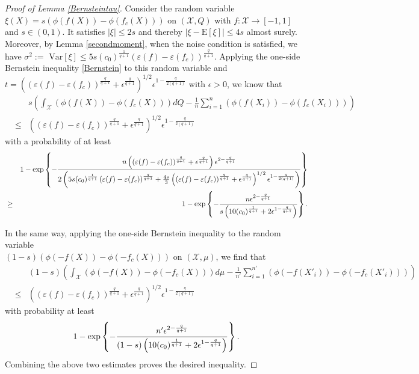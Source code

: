 \documentclass{article}
\begin{document}
\begin{proof}[Proof of Lemma \ref{Bernsteintau}]
Consider the random variable $\xi (X) = s\left(\phi(f(X)) - \phi(f_c(X))\right)$ on $({\mathcal X}, Q)$ with $f: {\mathcal X} \to [-1, 1]$ and $s\in (0, 1)$. It satisfies $|\xi| \leq 2s$ and thereby $|\xi - \mathrm{E}[\xi]|\le 4 s$ almost surely. Moreover, by Lemma \ref{secondmoment}, when the noise condition is satisfied, we have $\sigma^2 := \text{ Var}[\xi] \leq 5 s (c_0)^{\frac{1}{q+1}}\left(\varepsilon (f) - \varepsilon (f_c)\right)^{\frac{q}{q+1}}$.  
Applying the one-side Bernstein inequality \eqref{Bernstein} to this random variable and $t = \left(\left(\varepsilon (f) - \varepsilon (f_c)\right)^{\frac{q}{q+1}} + \epsilon^{\frac{q}{q+1}}\right)^{1/2} \epsilon^{1-{\frac{q}{2(q+1)}}}$ with $\epsilon >0$, we know that 
\begin{eqnarray*} 
&&s\left(\int_{{\mathcal X}} \left(\phi(f(X)) - \phi(f_c(X))\right) d Q - \frac{1}{n}\sum_{i=1}^n \left(\phi(f(X_i)) - \phi(f_c(X_i))\right)\right) \\
&\leq& \left(\left(\varepsilon (f) - \varepsilon (f_c)\right)^{\frac{q}{q+1}} + \epsilon^{\frac{q}{q+1}}\right)^{1/2} \epsilon^{1-{\frac{q}{2(q+1)}}} 
\end{eqnarray*}
with a probability of at least 
\begin{eqnarray*}
&& 1-  \exp \left\{-
{n \left(\left(\varepsilon (f) - \varepsilon (f_c)\right)^{\frac{q}{q+1}} + \epsilon^{\frac{q}{q+1}}\right) \epsilon^{2-{\frac{q}{q+1}}} \over 2\left(5 s (c_0)^{\frac{1}{q+1}}\left(\varepsilon (f) - \varepsilon (f_c)\right)^{\frac{q}{q+1}} +{4 s \over 3}\left(\left(\varepsilon (f) - \varepsilon (f_c)\right)^{\frac{q}{q+1}} + \epsilon^{\frac{q}{q+1}}\right)^{1/2} \epsilon^{1-{\frac{q}{2(q+1)}}}\right)}\right\} \\
&\geq& 1-  \exp \left\{-
{n \epsilon^{2-{\frac{q}{q+1}}} \over s\left(10 (c_0)^{\frac{1}{q+1}} +2 \epsilon^{1-{\frac{q}{q+1}}}\right)}\right\}.
\end{eqnarray*}

In the same way, applying the one-side Bernstein inequality to the random variable \\$ (1-s)\left(\phi(-f(X)) - \phi(-f_c(X))\right)$ on $({\mathcal X}, \mu)$, we find that 
\begin{eqnarray*} 
&&(1-s) \left(\int_{{\mathcal X}} \left(\phi(-f(X)) - \phi(-f_c(X)) \right) d \mu - \frac{1}{n'}\sum_{i=1}^{n'} \left(\phi(-f(X'_i)) - \phi(-f_c(X'_i))\right)\right) \\
&\leq& \left(\left(\varepsilon (f) - \varepsilon (f_c)\right)^{\frac{q}{q+1}} + \epsilon^{\frac{q}{q+1}}\right)^{1/2} \epsilon^{1-{\frac{q}{2(q+1)}}} 
\end{eqnarray*}
with probability at least 
\begin{eqnarray*}
1-  \exp \left\{-
{n' \epsilon^{2-{\frac{q}{q+1}}} \over (1-s) \left(10 (c_0)^{\frac{1}{q+1}} +2 \epsilon^{1-{\frac{q}{q+1}}}\right)}\right\}. 
\end{eqnarray*}
Combining the above two estimates proves the desired inequality. 
\end{proof}
\end{document}

